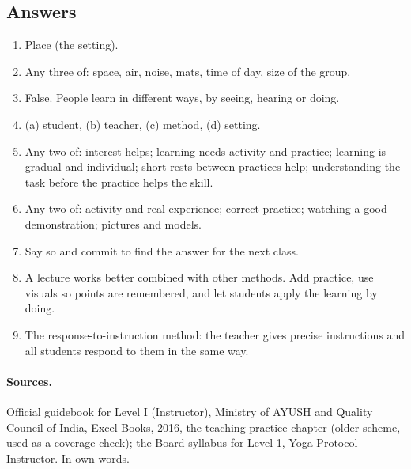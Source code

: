\subsection*{Answers}

\begin{enumerate}
\item Place (the setting).
\item Any three of: space, air, noise, mats, time of day, size of the group.
\item False. People learn in different ways, by seeing, hearing or doing.
\item (a) student, (b) teacher, (c) method, (d) setting.
\item Any two of: interest helps; learning needs activity and practice; learning is gradual and individual; short rests between practices help; understanding the task before the practice helps the skill.
\item Any two of: activity and real experience; correct practice; watching a good demonstration; pictures and models.
\item Say so and commit to find the answer for the next class.
\item A lecture works better combined with other methods. Add practice, use visuals so points are remembered, and let students apply the learning by doing.
\item The response-to-instruction method: the teacher gives precise instructions and all students respond to them in the same way.
\end{enumerate}

\paragraph{Sources.} Official guidebook for Level I (Instructor), Ministry of AYUSH and Quality Council of India, Excel Books, 2016, the teaching practice chapter (older scheme, used as a coverage check); the Board syllabus for Level 1, Yoga Protocol Instructor. In own words.
